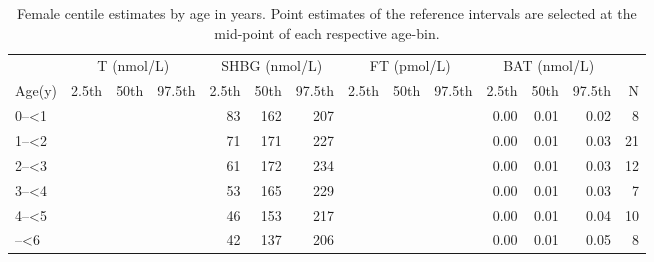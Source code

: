 \documentclass[]{elsarticle} %
\begin{document}
\begin{table}[H]

\caption{\label{tab:table2}\label{tab:tab2}Female centile estimates by age in years.  Point estimates of the reference intervals are selected at the mid-point of each respective age-bin.}
\centering
\fontsize{7}{9}\selectfont
\begin{tabular}[t]{l>{}r>{}r>{}rrrr>{}r>{}r>{}rrrrr}
\toprule
\multicolumn{1}{c}{ } & \multicolumn{3}{c}{T (nmol/L)} & \multicolumn{3}{c}{SHBG (nmol/L)} & \multicolumn{3}{c}{FT (pmol/L)} & \multicolumn{3}{c}{BAT (nmol/L)} \\
\cmidrule(l{3pt}r{3pt}){2-4} \cmidrule(l{3pt}r{3pt}){5-7} \cmidrule(l{3pt}r{3pt}){8-10} \cmidrule(l{3pt}r{3pt}){11-13}
Age(y) & 2.5th & 50th & 97.5th & 2.5th & 50th & 97.5th & 2.5th & 50th & 97.5th & 2.5th & 50th & 97.5th & N\\
\midrule
0--<1 & \cellcolor[HTML]{ececec}{0.04} & \cellcolor[HTML]{ececec}{0.05} & \cellcolor[HTML]{ececec}{0.14} & 83 & 162 & 207 & \cellcolor[HTML]{ececec}{0.18} & \cellcolor[HTML]{ececec}{0.30} & \cellcolor[HTML]{ececec}{0.93} & 0.00 & 0.01 & 0.02 & 8\\
1--<2 & \cellcolor[HTML]{ececec}{0.03} & \cellcolor[HTML]{ececec}{0.05} & \cellcolor[HTML]{ececec}{0.16} & 71 & 171 & 227 & \cellcolor[HTML]{ececec}{0.15} & \cellcolor[HTML]{ececec}{0.30} & \cellcolor[HTML]{ececec}{1.11} & 0.00 & 0.01 & 0.03 & 21\\
2--<3 & \cellcolor[HTML]{ececec}{0.03} & \cellcolor[HTML]{ececec}{0.05} & \cellcolor[HTML]{ececec}{0.18} & 61 & 172 & 234 & \cellcolor[HTML]{ececec}{0.13} & \cellcolor[HTML]{ececec}{0.30} & \cellcolor[HTML]{ececec}{1.24} & 0.00 & 0.01 & 0.03 & 12\\
3--<4 & \cellcolor[HTML]{ececec}{0.03} & \cellcolor[HTML]{ececec}{0.05} & \cellcolor[HTML]{ececec}{0.19} & 53 & 165 & 229 & \cellcolor[HTML]{ececec}{0.13} & \cellcolor[HTML]{ececec}{0.31} & \cellcolor[HTML]{ececec}{1.35} & 0.00 & 0.01 & 0.03 & 7\\
4--<5 & \cellcolor[HTML]{ececec}{0.04} & \cellcolor[HTML]{ececec}{0.05} & \cellcolor[HTML]{ececec}{0.22} & 46 & 153 & 217 & \cellcolor[HTML]{ececec}{0.15} & \cellcolor[HTML]{ececec}{0.33} & \cellcolor[HTML]{ececec}{1.57} & 0.00 & 0.01 & 0.04 & 10\\
\addlinespace
5--<6 & \cellcolor[HTML]{ececec}{0.04} & \cellcolor[HTML]{ececec}{0.05} & \cellcolor[HTML]{ececec}{0.27} & 42 & 137 & 206 & \cellcolor[HTML]{ececec}{0.19} & \cellcolor[HTML]{ececec}{0.36} & \cellcolor[HTML]{ececec}{2.03} & 0.00 & 0.01 & 0.05 & 8\\

\end{tabular}
\end{table}
\end{document}
